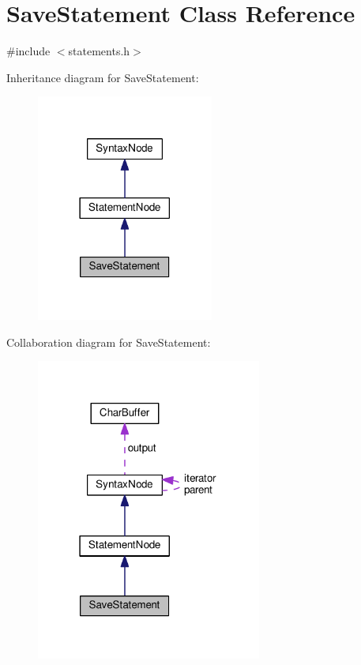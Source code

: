 \hypertarget{classSaveStatement}{}\section{Save\+Statement Class Reference}
\label{classSaveStatement}


{\ttfamily \#include $<$statements.\+h$>$}



Inheritance diagram for Save\+Statement\+:
\nopagebreak
\begin{figure}[H]
\begin{center}
\leavevmode
\includegraphics[width=165pt]{d2/d74/classSaveStatement__inherit__graph}
\end{center}
\end{figure}


Collaboration diagram for Save\+Statement\+:
\nopagebreak
\begin{figure}[H]
\begin{center}
\leavevmode
\includegraphics[width=210pt]{dd/d60/classSaveStatement__coll__graph}
\end{center}
\end{figure}
